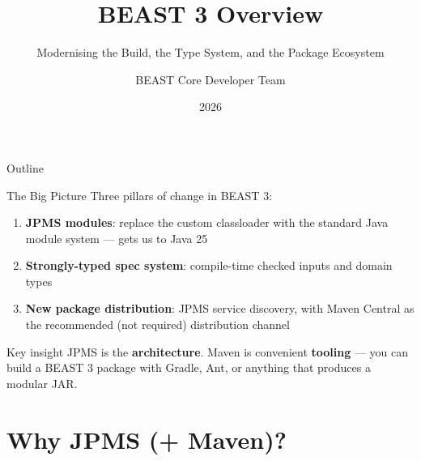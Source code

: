 \documentclass[aspectratio=169,11pt]{beamer}
\title{BEAST 3 Overview}
\subtitle{Modernising the Build, the Type System, and the Package Ecosystem}
\author{BEAST Core Developer Team}
\date{2026}
\begin{document}

\begin{frame}
\titlepage
\end{frame}


\begin{frame}{Outline}
\tableofcontents
\end{frame}


\begin{frame}{The Big Picture}
Three pillars of change in BEAST 3:
\vspace{1em}
\begin{enumerate}
\item \textbf{JPMS modules}: replace the custom classloader with the standard Java module system --- gets us to Java 25
\item \textbf{Strongly-typed spec system}: compile-time checked inputs and domain types
\item \textbf{New package distribution}: JPMS service discovery, with Maven Central as the recommended (not required) distribution channel
\end{enumerate}
\vspace{1em}
\begin{block}{Key insight}
JPMS is the \textbf{architecture}. Maven is convenient \textbf{tooling} --- you can build a BEAST 3 package with Gradle, Ant, or anything that produces a modular JAR.
\end{block}
\end{frame}

\section{Why JPMS (+ Maven)?}

\end{document}
